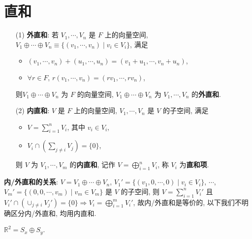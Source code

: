 \documentclass{note}
\begin{document}
\section{直和}
\begin{df}[直和]
    \begin{itemize}
        \item[(1)] \textbf{外直和}: 若 $V_1,\cdots,V_n$ 是 $F$ 上的向量空间, $V_1\oplus\cdots\oplus V_n\equiv\{(v_1,\cdots,v_n)\mid v_i\in V_i\}$, 满足
        \begin{itemize}
            \item $(v_1,\cdots,v_n)+(u_1,\cdots,u_n)=(v_1+u_1,\cdots,v_n+u_n)$,
            \item $\forall r\in F$, $r(v_1,\cdots,v_n)=(rv_1,\cdots,rv_n)$,
        \end{itemize}
        则$V_1\oplus\cdots\oplus V_n$ 为 $F$ 的向量空间, $V_1\oplus\cdots\oplus V_n$ 为 $V_1,\cdots,V_n$ 的\textbf{外直和}.
        \item[(2)] \textbf{内直和}: $V$ 是 $F$ 上的向量空间, $V_1,\cdots,V_n$ 是 $V$ 的子空间, 满足
        \begin{itemize}
            \item $V=\sum_{i=1}^nV_i$, 其中 $v_i\in V_i$,
            \item $V_i\cap(\sum_{j\neq i}V_j)=\{0\}$,
        \end{itemize}
        则 $V$ 为 $V_1,\cdots,V_m$ 的\textbf{内直和}, 记作 $V=\bigoplus_{i=1}^nV_i$, 称 $V_i$ 为\textbf{直和项}.
    \end{itemize}
\end{df}

\textbf{内/外直和的关系}:
$V=V_1\oplus\cdots\oplus V_n$, $V_1'=\{(v_1,0,\cdots,0)\mid v_i\in V_i\}$, $\cdots$, $V_m'=\{(0,0,\cdots,v_m)\mid v_m\in V_m\}$ 是 $V$ 的子空间, 则 $V=\sum_{i=1}^nV_i'$ 且 $V_i'\cap(\cup_{j\neq i}V_j')=\{0\}\Longrightarrow V_i=\bigoplus_{i=1}^mV_i'$, 故内/外直和是等价的, 以下我们不明确区分内/外直和, 均用内直和.

\begin{eg}
    $\mathbb{R}^2=S_x\oplus S_y$.
\end{eg}
\end{document}
